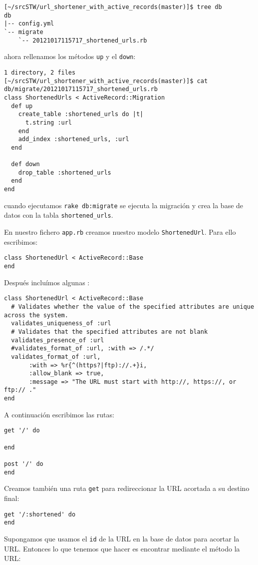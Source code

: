 \begin{verbatim}
[~/srcSTW/url_shortener_with_active_records(master)]$ tree db
db
|-- config.yml
`-- migrate
    `-- 20121017115717_shortened_urls.rb
\end{verbatim}
ahora rellenamos los métodos \verb|up| y el \verb|down|:
\begin{verbatim}
1 directory, 2 files
[~/srcSTW/url_shortener_with_active_records(master)]$ cat db/migrate/20121017115717_shortened_urls.rb 
class ShortenedUrls < ActiveRecord::Migration
  def up
    create_table :shortened_urls do |t|
      t.string :url
    end
    add_index :shortened_urls, :url
  end

  def down
    drop_table :shortened_urls
  end
end
\end{verbatim}
cuando ejecutamos \verb|rake db:migrate| se ejecuta la migración y crea la base de datos
con la tabla \verb|shortened_urls|.


En nuestro fichero \verb|app.rb| creamos nuestro modelo \verb|ShortenedUrl|.
Para ello escribimos:
\begin{verbatim}
class ShortenedUrl < ActiveRecord::Base
end
\end{verbatim}
Después incluímos algunas :
\begin{verbatim}
class ShortenedUrl < ActiveRecord::Base
  # Validates whether the value of the specified attributes are unique across the system.
  validates_uniqueness_of :url
  # Validates that the specified attributes are not blank
  validates_presence_of :url
  #validates_format_of :url, :with => /.*/
  validates_format_of :url, 
       :with => %r{^(https?|ftp)://.+}i, 
       :allow_blank => true, 
       :message => "The URL must start with http://, https://, or ftp:// ."
end
\end{verbatim}
A continuación escribimos las rutas:
\begin{verbatim}
get '/' do
  
end

post '/' do
end
\end{verbatim}
Creamos también una ruta \verb|get| para redireccionar la URL
acortada a su destino final:
\begin{verbatim}
get '/:shortened' do
end
\end{verbatim}
Supongamos  que  usamos el \verb|id| de la URL en la base de datos 
para acortar la URL.
Entonces lo que tenemos que hacer es 
encontrar mediante el método  
la URL:

